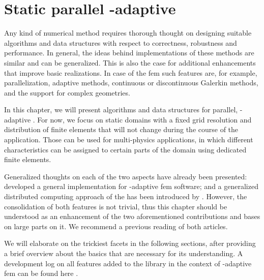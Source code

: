 \chapter{Static parallel \hp-adaptive }
\label{ch:parallel}
\glsresetall

Any kind of numerical method requires thorough thought on designing suitable algorithms and data structures with respect to correctness, robustness and performance. In general, the ideas behind implementations of these methods are similar and can be generalized.
This is also the case for additional enhancements that improve basic realizations. In case of the \gls{fem} such features are, for example, parallelization, adaptive methods, continuous or discontinuous Galerkin methods, and the support for complex geometries.

In this chapter, we will present algorithms and data structures for parallel, \hp-adaptive . For now, we focus on static domains with a fixed grid resolution and distribution of finite elements that will not change during the course of the application. Those can be used for multi-physics applications, in which different characteristics can be assigned to certain parts of the domain using dedicated finite elements.

Generalized thoughts on each of the two aspects have already been presented: \textcite{bangerth2009} developed a general implementation for \hp-adaptive \gls{fem} software; and a generalized distributed computing approach of the  has been introduced by \textcite{bangerth2012}. However, the consolidation of both features is not trivial, thus this chapter should be understood as an enhancement of the two aforementioned contributions and bases on large parts on it. We recommend a previous reading of both articles.

We will elaborate on the trickiest facets in the following sections, after providing a brief overview about the basics that are necessary for its understanding. A development log on all features added to the \dealii{} library in the context of \hp-adaptive \gls{fem} can be found here \textcite{dealiiissue3511}.





